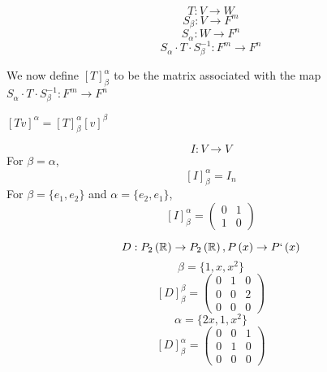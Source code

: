 \documentclass[11pt,a4paper]{colorart}
\def\l{\left}
\def\r{\right}
\def\R{\mathbb{R}}
\def\a{\alpha}
\def\b{\beta}
\begin{document}
	   \[ T : V \rightarrow W \]	
	   \[ S_\b : V \rightarrow F^m \]	
	   \[ S_\a : W \rightarrow F^n \]	
	   \[ S_\a \cdot T \cdot S_\b^{-1}  : F^m \rightarrow F^n \]	

We now define $\l[T\r]_\b^\a$ to be the matrix associated with the map $S_\a \cdot T \cdot S_\b^{-1}  : F^m \rightarrow F^n$

\begin{conjecture}
	 $\l[Tv\r]^\a = \l[T\r]^\a_\b\l[v\r]^\b$
\end{conjecture}

\begin{example}
	\[ I:V\rightarrow V \]
	For $\b=\a$,
	\[ \l[I\r]^\a_\b = I_n \]
	For $\b = \{ e_1,e_2 \}$ and $\a = \{ e_2, e_1 \}$,
	\[ \l[I\r]^\a_\b = \begin{pmatrix} 0&1\\1&0\end{pmatrix} \]
\end{example}

\begin{example}[Differentiation]
	\[ D:P_2\l(\R\r) \rightarrow P_2\l(\R\r), P\l(x\r) \rightarrow P`\l(x\r) \]
	\[ \b = \{ 1, x, x^2 \} \]
	\[ \l[D\r]^\b_\b = \begin{pmatrix} 0&1&0\\0&0&2\\0&0&0\end{pmatrix} \]
	\[ \a = \{ 2x, 1, x^2 \} \]
	\[ \l[D\r]^\a_\b = \begin{pmatrix} 0&0&1\\0&1&0\\0&0&0\end{pmatrix} \]
\end{example}
\end{document}

